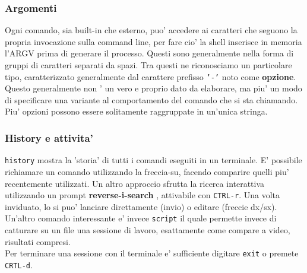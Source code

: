 \subsubsection{Argomenti}
Ogni comando, sia built-in che esterno, puo' accedere ai caratteri che seguono la propria invocazione sulla
command line, per fare cio' la shell inserisce in memoria l'ARGV prima di generare il processo. Questi sono
generalmente nella forma di gruppi di caratteri separati da spazi. Tra questi ne riconosciamo un particolare
tipo, caratterizzato generalmente dal carattere prefisso \texttt{'-'} noto come \textbf{opzione}. Questo 
generalmente non ' un vero e proprio dato da elaborare, ma piu' un modo di specificare una variante al 
comportamento del comando che si sta chiamando. Piu' opzioni possono essere solitamente raggruppate in un'unica
stringa.

\subsubsection{History e attivita'}
\texttt{history} mostra la 'storia' di tutti i comandi eseguiti in un terminale. 
E' possibile richiamare un comando utilizzando la freccia-su, facendo comparire quelli piu' recentemente utilizzati. Un altro approccio sfrutta
la ricerca interattiva utilizzando un prompt \textbf{reverse-i-search} , attivabile con \texttt{CTRL-r}. 
Una volta inviduato, lo si puo' lanciare direttamente (invio) o editare (freccie dx/sx). \\
Un'altro comando interessante e' invece \texttt{script} il quale permette invece di catturare su un file 
una sessione di lavoro, esattamente come compare a video, risultati compresi.\\
Per terminare una sessione con il terminale e' sufficiente digitare \texttt{exit} o premete \texttt{CRTL-d}.

